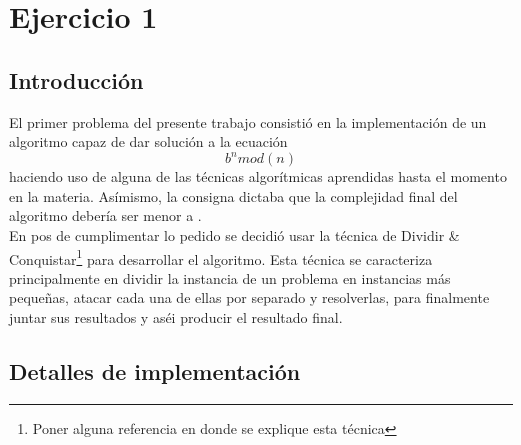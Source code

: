 \section*{Ejercicio 1}

\subsection*{Introducción}
El primer problema del presente trabajo consistió en la implementación de un algoritmo capaz de dar solución a la ecuación \begin{equation} b^n mod (n) \end{equation} haciendo uso de alguna de las técnicas algorítmicas aprendidas hasta el momento en la materia. Asímismo, la consigna dictaba que la complejidad final del algoritmo debería ser menor a .\\
En pos de cumplimentar lo pedido se decidió usar la técnica de Dividir \& Conquistar\footnote{Poner alguna referencia en donde se explique esta técnica} para desarrollar el algoritmo. Esta técnica se caracteriza principalmente en dividir la instancia de un problema en instancias más pequeñas, atacar cada una de ellas por separado y resolverlas, para finalmente juntar sus resultados y aséi producir el resultado final.

\subsection*{Detalles de implementación}


